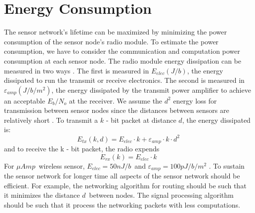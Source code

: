 \section{Energy Consumption}
	The sensor network's lifetime can be maximized by minimizing the power consumption of the sensor node's radio module.
	To estimate the power consumption, we have to consider the communication and computation power consumption at each sensor node.
	The radio module energy dissipation can be measured in two ways \cite{wang2002energy}.
	The first is measured in $E_{elec} (J/b)$, the energy dissipated to run the transmit or receive electronics.
	The second is measured in $\varepsilon_{amp} (J/b/m^2)$, the energy dissipated by the transmit power amplifier to achieve an acceptable $E_{b} / N_{o} $ at the receiver.
	We assume the $d^2$ energy loss for transmission between sensor nodes since the distances between sensors are relatively short \cite{ettus1998system}. 
	To transmit a $k$ - bit packet at distance $d$, the energy dissipated is:
	\begin{equation}
		E_{tx}(k, d) = E_{elec} \cdot k + \varepsilon_{amp} \cdot k \cdot d^{2}
	\end{equation}
	and to receive the k - bit packet, the radio expends
	\begin{equation}
		E_{rx}(k) = E_{elec} \cdot k
	\end{equation}
	For $\mu Amp$\ wireless sensor, $E_{elec} = 50nJ/b$\ and $\varepsilon_{amp} = 100pJ/b/m^2$ \cite{wang2002energy}.
	To sustain the sensor network for longer time all aspects of the sensor network should be efficient.
	For example, the networking algorithm for routing should be such that it minimizes the distance $d$\ between nodes.
	The signal processing algorithm should be such that it process the networking packets with less computations.

